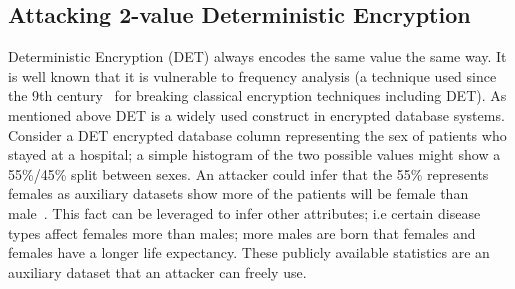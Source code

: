 \documentclass[journal]{IEEEtran}
\begin{document}
\subsection{Attacking 2-value Deterministic Encryption}
Deterministic Encryption (DET) always encodes the same value the same way. It is well known that it is vulnerable to frequency analysis (a technique used since the 9th century~\cite{Arab} for breaking classical encryption techniques including DET). As mentioned above DET is a widely used construct in encrypted database systems. Consider a DET encrypted database column representing the sex of patients who stayed at a hospital; a simple histogram of the two possible values might show a 55\%/45\% split between sexes. An attacker could infer that the 55\% represents females as auxiliary datasets show more of the patients will be female than male~\cite{InfrenceAttacks}. This fact can be leveraged to infer other attributes; i.e certain disease types affect females more than males; more males are born that females and females have a longer life expectancy. These publicly available statistics are an auxiliary dataset that an attacker can freely use. 
\end{document}

